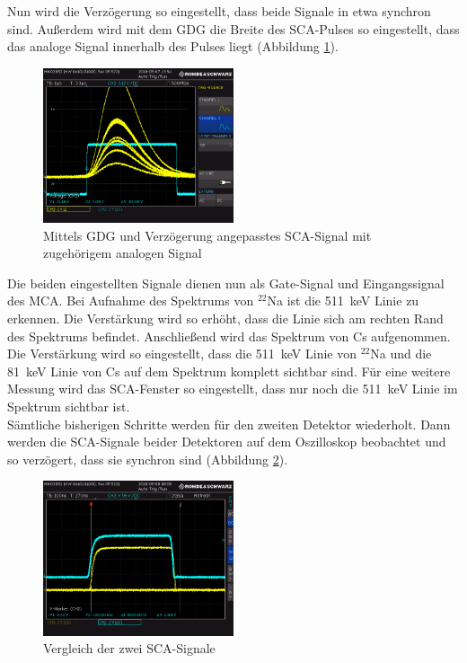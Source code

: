 Nun wird die Verzögerung so eingestellt, dass beide Signale in etwa synchron sind. Außerdem wird mit dem GDG die Breite des SCA-Pulses so eingestellt, dass das analoge Signal innerhalb des Pulses liegt (Abbildung \ref{fig:zeitliche_breite_sca_und_analog}).
\newpage
\begin{figure}[h]
  \centering
  \includegraphics[width=0.5\textwidth]{data/oszi/zeitliche_breite_sca_und_analog.PNG}
  \caption{Mittels GDG und Verzögerung angepasstes SCA-Signal mit zugehörigem analogen Signal}
  \label{fig:zeitliche_breite_sca_und_analog}
\end{figure}
Die beiden eingestellten Signale dienen nun als Gate-Signal und Eingangssignal des MCA. Bei Aufnahme des Spektrums von $^{22}$Na ist die \SI{511}{\kilo\electronvolt} Linie zu erkennen. Die Verstärkung wird so erhöht, dass die Linie sich am rechten Rand des Spektrums befindet. Anschließend wird das Spektrum von Cs aufgenommen. Die Verstärkung wird so eingestellt, dass die \SI{511}{\kilo\electronvolt} Linie von $^{22}$Na und die \SI{81}{\kilo\electronvolt} Linie von Cs auf dem Spektrum komplett sichtbar sind. Für eine weitere Messung wird das SCA-Fenster so eingestellt, dass nur noch die \SI{511}{\kilo\electronvolt} Linie im Spektrum sichtbar ist. 
\\

Sämtliche bisherigen Schritte werden für den zweiten Detektor wiederholt. Dann werden die SCA-Signale beider Detektoren auf dem Oszilloskop beobachtet und so verzögert, dass sie synchron sind (Abbildung \ref{fig:slow_koinzidenz}).
\begin{figure}[h]
  \centering
  \includegraphics[width=0.5\textwidth]{data/oszi/slow_koinzidenz.PNG}
  \caption{Vergleich der zwei SCA-Signale}
  \label{fig:slow_koinzidenz}
\end{figure}


